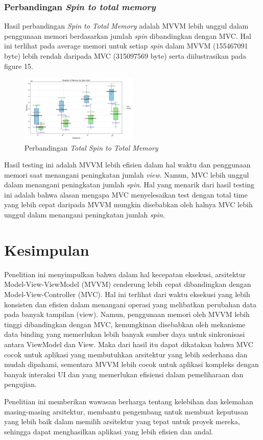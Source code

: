\documentclass[conference]{IEEEtran}
\begin{document}
	\subsubsection{Perbandingan \textit{Spin to total memory}}
	Hasil perbandingan \textit{Spin to Total Memory} adalah MVVM lebih unggul dalam penggunaan memori berdasarkan jumlah \textit{spin} dibandingkan dengan MVC. Hal ini terlihat pada average memori untuk setiap \textit{spin} dalam MVVM (155467091 byte) lebih rendah daripada MVC (315097569 byte) serta diilustrasikan pada figure 15.
	
	\begin{figure}[h]
		\centering
		\includegraphics[width=0.5\textwidth]{../mvc-mvvm/plot_spin_total_memory.pdf}
		\caption{Perbandingan \textit{Total Spin to Total Memory}}
		\label{fig:total_spin_to_total_memory}
	\end{figure}
	
	Hasil testing ini adalah MVVM lebih efisien dalam hal waktu dan penggunaan memori saat menangani peningkatan jumlah \textit{view}. Namun, MVC lebih unggul dalam menangani peningkatan jumlah \textit{spin}. Hal yang menarik dari hasil testing ini adalah bahwa alasan mengapa MVC menyelesaikan test dengan total time yang lebih cepat daripada MVVM mungkin disebabkan oleh halnya MVC lebih unggul dalam menangani peningkatan jumlah \textit{spin}.
	
	
	\section{Kesimpulan}
	Penelitian ini menyimpulkan bahwa dalam hal kecepatan eksekusi, arsitektur Model-View-ViewModel (MVVM) cenderung lebih cepat dibandingkan dengan Model-View-Controller (MVC). Hal ini terlihat dari waktu eksekusi yang lebih konsisten dan efisien dalam menangani operasi yang melibatkan perubahan data pada banyak tampilan (view). Namun, penggunaan memori oleh MVVM lebih tinggi dibandingkan dengan MVC, kemungkinan disebabkan oleh mekanisme data binding yang memerlukan lebih banyak sumber daya untuk sinkronisasi antara ViewModel dan View. Maka dari hasil itu dapat dikatakan bahwa MVC cocok untuk aplikasi yang membutuhkan arsitektur yang lebih sederhana dan mudah dipahami, sementara MVVM lebih cocok untuk aplikasi kompleks dengan banyak interaksi UI dan yang memerlukan efisiensi dalam pemeliharaan dan pengujian.
	
	Penelitian ini memberikan wawasan berharga tentang kelebihan dan kelemahan masing-masing arsitektur, membantu pengembang untuk membuat keputusan yang lebih baik dalam memilih arsitektur yang tepat untuk proyek mereka, sehingga dapat menghasilkan aplikasi yang lebih efisien dan andal.
	
	
	\vspace{12pt}
	
\end{document}
